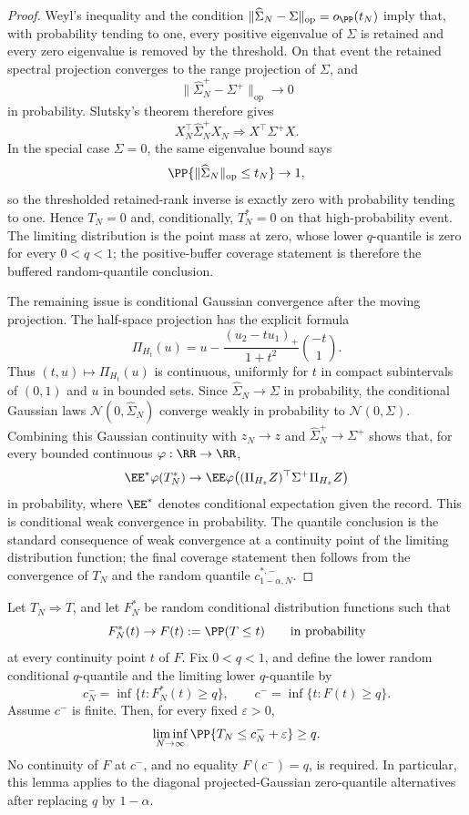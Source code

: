 \begin{proof}
Weyl's inequality and the condition
\(\|\widehat\Sigma_N-\Sigma\|_{\operatorname{op}}=o_{\PP}(t_N)\) imply that,
with probability tending to one, every positive eigenvalue of \(\Sigma\) is
retained and every zero eigenvalue is removed by the threshold.  On that event
the retained spectral projection converges to the range projection of
\(\Sigma\), and
\[
\|\widehat\Sigma_N^+-\Sigma^+\|_{\operatorname{op}}\to0
\]
in probability.  Slutsky's theorem therefore gives
\[
X_N^\top\widehat\Sigma_N^+X_N
\Rightarrow X^\top\Sigma^+X .
\]
In the special case \(\Sigma=0\), the same eigenvalue bound says
\[
\PP\{\|\widehat\Sigma_N\|_{\operatorname{op}}\le t_N\}\to1,
\]
so the thresholded retained-rank inverse is exactly zero with probability
tending to one.  Hence \(T_N=0\) and, conditionally, \(T_N^\ast=0\) on that
high-probability event.  The limiting distribution is the point mass at zero,
whose lower \(q\)-quantile is zero for every \(0<q<1\); the positive-buffer
coverage statement is therefore the buffered random-quantile conclusion.

The remaining issue is conditional Gaussian convergence after the moving
projection.  The half-space projection has the explicit formula
\[
\Pi_{H_t}(u)
=u-\frac{(u_2-tu_1)_+}{1+t^2}\binom{-t}{1}.
\]
Thus \((t,u)\mapsto\Pi_{H_t}(u)\) is continuous, uniformly for \(t\) in compact
subintervals of \((0,1)\) and \(u\) in bounded sets.  Since
\(\widehat\Sigma_N\to\Sigma\) in probability, the conditional Gaussian laws
\(\mathcal N(0,\widehat\Sigma_N)\) converge weakly in probability to
\(\mathcal N(0,\Sigma)\).  Combining this Gaussian continuity with
\(z_N\to z\) and \(\widehat\Sigma_N^+\to\Sigma^+\) shows that, for every
bounded continuous \(\varphi:\RR\to\RR\),
\[
\EE^\ast\varphi(T_N^\ast)
\to
\EE\varphi\!\left((\Pi_{H_z}Z)^\top\Sigma^+\Pi_{H_z}Z\right)
\]
in probability, where \(\EE^\ast\) denotes conditional expectation given the
record.  This is conditional weak convergence in probability.  The quantile
conclusion is the standard consequence of weak convergence at a continuity
point of the limiting distribution function; the final coverage statement
then follows from the convergence of \(T_N\) and the random quantile
\(c_{1-\alpha,N}^{\ast,-}\).
\end{proof}

\begin{lemma}\label{lem:buffered-random-quantile-coverage-main}
Let \(T_N\Rightarrow T\), and let \(F_N^\ast\) be random conditional
distribution functions such that
\[
F_N^\ast(t)\to F(t):=\PP(T\le t)
\qquad\text{in probability}
\]
at every continuity point \(t\) of \(F\).  Fix \(0<q<1\), and define the
lower random conditional \(q\)-quantile and the limiting lower \(q\)-quantile
by
\[
c_N^-=\inf\{t:F_N^\ast(t)\ge q\},
\qquad
c^-=\inf\{t:F(t)\ge q\}.
\]
Assume \(c^-\) is finite.  Then, for every fixed \(\varepsilon>0\),
\[
\liminf_{N\to\infty}\PP\{T_N\le c_N^-+\varepsilon\}\ge q .
\]
No continuity of \(F\) at \(c^-\), and no equality \(F(c^-)=q\), is required.
In particular, this lemma applies to the diagonal projected-Gaussian
zero-quantile alternatives after replacing \(q\) by \(1-\alpha\).
\end{lemma}

